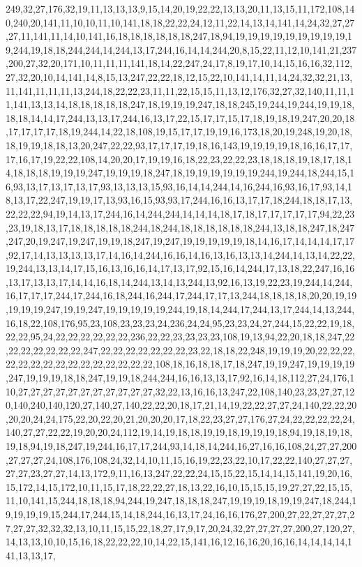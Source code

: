 249,32,27,176,32,19,11,13,13,13,9,15,14,20,19,22,22,13,13,20,11,13,15,11,172,108,140,240,20,141,11,10,10,11,10,141,18,18,22,22,24,12,11,22,14,13,14,141,14,24,32,27,27,27,11,141,11,14,10,141,16,18,18,18,18,18,18,247,18,94,19,19,19,19,19,19,19,19,19,19,244,19,18,18,244,244,14,244,13,17,244,16,14,14,244,20,8,15,22,11,12,10,141,21,237,200,27,32,20,171,10,11,11,11,141,18,14,22,247,24,17,8,19,17,10,14,15,16,16,32,112,27,32,20,10,14,141,14,8,15,13,247,22,22,18,12,15,22,10,141,14,11,14,24,32,32,21,13,11,141,11,11,11,13,244,18,22,22,23,11,11,22,15,15,11,13,12,176,32,27,32,140,11,11,11,141,13,13,14,18,18,18,18,18,247,18,19,19,19,247,18,18,245,19,244,19,244,19,19,18,18,18,14,14,17,244,13,13,17,244,16,13,17,22,15,17,17,15,17,18,19,18,19,247,20,20,18,17,17,17,17,18,19,244,14,22,18,108,19,15,17,17,19,19,16,173,18,20,19,248,19,20,18,18,19,19,18,18,13,20,247,22,22,93,17,17,17,19,18,16,143,19,19,19,19,18,16,16,17,17,17,16,17,19,22,22,108,14,20,20,17,19,19,16,18,22,23,22,22,23,18,18,18,19,18,17,18,14,18,18,18,19,19,19,247,19,19,19,18,247,18,19,19,19,19,19,19,244,19,244,18,244,15,16,93,13,17,13,17,13,17,93,13,13,13,15,93,16,14,14,244,14,16,244,16,93,16,17,93,14,18,13,17,22,247,19,19,17,13,93,16,15,93,93,17,244,16,16,13,17,17,18,244,18,18,17,13,22,22,22,94,19,14,13,17,244,16,14,244,244,14,14,14,18,17,18,17,17,17,17,17,94,22,23,23,19,18,13,17,18,18,18,18,18,244,18,244,18,18,18,18,18,18,244,13,18,18,247,18,247,247,20,19,247,19,247,19,19,18,247,19,247,19,19,19,19,19,18,14,16,17,14,14,14,17,17,92,17,14,13,13,13,13,17,14,16,14,244,16,16,14,16,13,16,13,13,14,244,14,13,14,22,22,19,244,13,13,14,17,15,16,13,16,16,14,17,13,17,92,15,16,14,244,17,13,18,22,247,16,16,13,17,13,13,17,14,14,16,18,14,244,13,14,13,244,13,92,16,13,19,22,23,19,244,14,244,16,17,17,17,244,17,244,16,18,244,16,244,17,244,17,17,13,244,18,18,18,18,20,20,19,19,19,19,19,247,19,19,247,19,19,19,19,19,244,19,18,14,244,17,244,13,17,244,14,13,244,16,18,22,108,176,95,23,108,23,23,23,24,236,24,24,95,23,23,24,27,244,15,22,22,19,18,22,22,95,24,22,22,22,22,22,22,236,22,22,23,23,23,23,108,19,13,94,22,20,18,18,247,22,22,22,22,22,22,22,247,22,22,22,22,22,22,22,23,22,18,18,22,248,19,19,19,20,22,22,22,22,22,22,22,22,22,22,22,22,22,22,22,108,18,16,18,18,17,18,247,19,19,247,19,19,19,19,247,19,19,19,18,18,247,19,19,18,244,244,16,16,13,13,17,92,16,14,18,112,27,24,176,110,27,27,27,27,27,27,27,27,27,27,27,32,22,13,16,16,13,247,22,108,140,23,23,27,27,120,140,240,140,120,27,140,27,140,22,22,20,18,17,21,14,19,22,22,27,27,24,140,22,22,20,20,20,24,24,175,22,20,22,20,21,20,20,20,17,18,22,23,27,27,176,27,24,22,22,22,22,24,140,27,27,22,22,19,20,20,24,112,19,14,19,18,18,19,19,18,19,19,19,18,94,19,18,19,18,19,18,94,19,18,247,19,244,16,17,17,244,93,14,18,14,244,16,27,16,16,108,24,27,27,200,27,27,27,24,108,176,108,24,32,14,10,11,15,16,19,22,23,22,10,17,22,22,140,27,27,27,27,27,23,27,27,14,13,172,9,11,16,13,247,22,22,24,15,15,22,15,14,14,15,141,19,20,16,15,172,14,15,172,10,11,15,17,18,22,22,27,18,13,22,16,10,15,15,15,19,27,27,22,15,15,11,10,141,15,244,18,18,18,94,244,19,247,18,18,18,247,19,19,19,18,19,19,247,18,244,19,19,19,19,15,244,17,244,15,14,18,244,16,13,17,24,16,16,176,27,200,27,22,27,27,27,27,27,27,32,32,32,13,10,11,15,15,22,18,27,17,9,17,20,24,32,27,27,27,27,200,27,120,27,14,13,13,10,10,15,16,18,22,22,22,10,14,22,15,141,16,12,16,16,20,16,16,14,14,14,14,141,13,13,17,